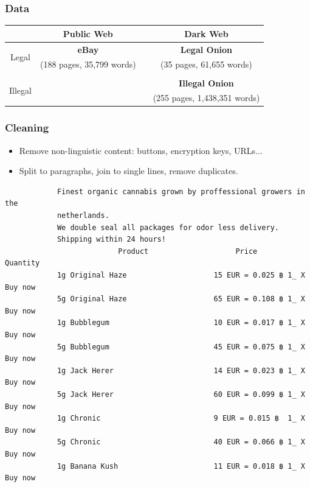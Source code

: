 \documentclass[t,xcolor={svgnames,table}]{beamer}
\begin{document}
\begin{frame}
	\frametitle{Data}
	
	\begin{center}
	\def\arraystretch{2}
	\begin{tabular}{c|ccc}
	& Public Web && Dark Web \\ 
	\hline
	\multirow{2}{*}{Legal} & \textbf{\color{yellow} eBay} && \textbf{\color{green} Legal Onion} \\
	& (188 pages, 35,799 words) && (35 pages, 61,655 words) \\\\
	\multirow{2}{*}{Illegal} &&& \textbf{\color{red} Illegal Onion} \\
	&&& (255 pages, 1,438,351 words)
	\end{tabular}
	\end{center}
\end{frame}

\begin{frame}[fragile]
	\frametitle{Cleaning}
	\begin{itemize}\setlength\itemsep{1em}
	\item Remove non-linguistic content: buttons, encryption keys, URLs...
	
	\item Split to paragraphs, join to single lines, remove duplicates.

	\end{itemize}
	\small
	\begin{center}\color{red}
		\begin{verbatim}
			Finest organic cannabis grown by proffessional growers in the
			netherlands.
			We double seal all packages for odor less delivery.
			Shipping within 24 hours!
			              Product                    Price          Quantity
			1g Original Haze                    15 EUR = 0.025 ฿ 1_ X Buy now
			5g Original Haze                    65 EUR = 0.108 ฿ 1_ X Buy now
			1g Bubblegum                        10 EUR = 0.017 ฿ 1_ X Buy now
			5g Bubblegum                        45 EUR = 0.075 ฿ 1_ X Buy now
			1g Jack Herer                       14 EUR = 0.023 ฿ 1_ X Buy now
			5g Jack Herer                       60 EUR = 0.099 ฿ 1_ X Buy now
			1g Chronic                          9 EUR = 0.015 ฿  1_ X Buy now
			5g Chronic                          40 EUR = 0.066 ฿ 1_ X Buy now
			1g Banana Kush                      11 EUR = 0.018 ฿ 1_ X Buy now
		\end{verbatim}
	\end{center}
\end{frame}
\end{document}
